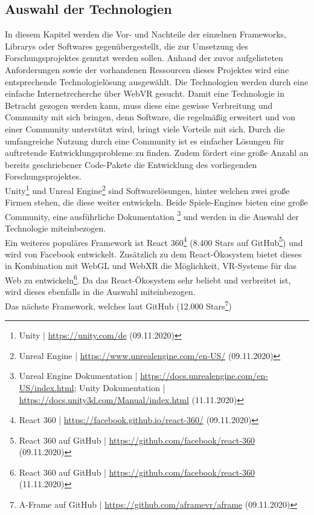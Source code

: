 \documentclass[a4paper,12pt,oneside]{article}
\begin{document}
    \subsection{Auswahl der Technologien}
      In diesem Kapitel werden die Vor- und Nachteile der einzelnen Frameworks, Librarys
      oder Softwares gegenübergestellt, die zur Umsetzung des Forschungsprojektes genutzt
      werden sollen. Anhand der zuvor aufgelisteten Anforderungen sowie der vorhandenen
      Ressourcen dieses Projektes wird eine entsprechende Technologielösung 
      ausgewählt.
      Die Technologien werden durch eine einfache Internetrecherche über WebVR gesucht.
      Damit eine Technologie in Betracht gezogen werden kann, muss diese eine gewisse
      Verbreitung und Community mit sich bringen, denn Software, die regelmäßig erweitert
      und von einer Community unterstützt wird, bringt viele Vorteile mit sich. 
      Durch die umfangreiche Nutzung durch eine Community ist es einfacher Lösungen
      für auftretende Entwicklungsprobleme zu finden. Zudem fördert eine große
      Anzahl an bereits geschriebener Code-Pakete die Entwicklung des vorliegenden 
      Forschungsprojektes. \\
      Unity\footnote{Unity | \url{https://unity.com/de} (09.11.2020)} und 
      Unreal Engine\footnote{Unreal Engine | \url{https://www.unrealengine.com/en-US/} (09.11.2020)} 
      sind Softwarelösungen, hinter welchen zwei große
      Firmen stehen, die diese weiter entwickeln. Beide Spiele-Engines bieten eine
      große Community, eine ausführliche Dokumentation
      \footnote{Unreal Engine Dokumentation | \url{https://docs.unrealengine.com/en-US/index.html}; Unity Dokumentation | \url{https://docs.unity3d.com/Manual/index.html} (11.11.2020)}
      und werden in die Auswahl der Technologie miteinbezogen. \\
      Ein weiteres populäres Framework ist React 360\footnote{React 360 | \url{https://facebook.github.io/react-360/} (09.11.2020)}
      (8.400 Stars auf GitHub\footnote{React 360 auf GitHub | \url{https://github.com/facebook/react-360} (09.11.2020)})
      und wird von Facebook entwickelt. 
      Zusätzlich zu dem React-Ökosystem bietet dieses in Kombination mit WebGL und WebXR
      die Möglichkeit, VR-Systeme für das Web zu entwickeln\footnote{React 360 auf GitHub | \url{https://github.com/facebook/react-360} (11.11.2020)}.      
      Da das React-Ökosystem sehr beliebt und verbreitet
      ist, wird dieses ebenfalls in die Auswahl miteinbezogen.\\
      Das nächste Framework, welches laut GitHub (12.000 Stars\footnote{A-Frame auf GitHub | \url{https://github.com/aframevr/aframe} (09.11.2020)}) 
\end{document}
